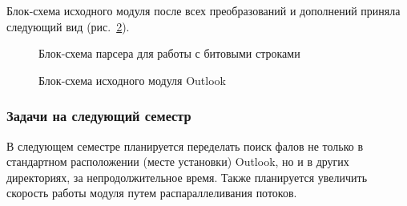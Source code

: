 Блок-схема исходного модуля после всех преобразований и дополнений приняла следующий вид
(рис.~\ref{ser_5:ser_5}).

\begin{figure}[h!]
\caption{Блок-схема парсера для работы с битовыми строками}
\label{ser_4:ser_4}
\end{figure} 

\begin{figure}[h!]
\caption{Блок-схема исходного модуля Outlook}
\label{ser_5:ser_5}
\end{figure} 


\subsubsection{Задачи на следующий семестр}

В следующем семестре планируется переделать поиск фалов не только в стандартном 
расположении (месте установки) Outlook, но и в других директориях, за непродолжительное 
время. Также планируется увеличить скорость работы модуля путем распараллеливания  потоков.

\clearpage
